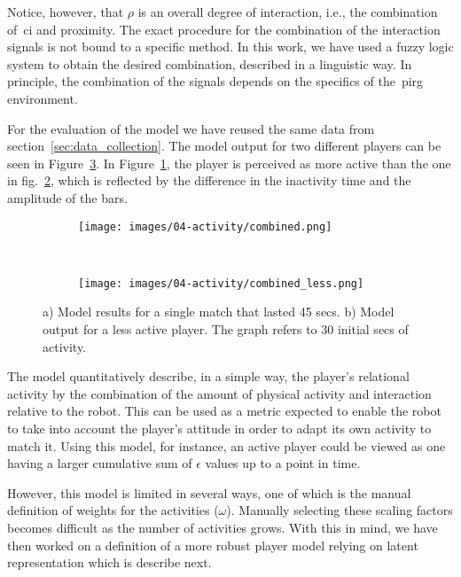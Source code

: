 Notice, however, that $\rho$ is an overall degree of interaction, i.e., the combination of~\gls{ci} and proximity. The exact procedure for the combination of the interaction signals is not bound to a specific method. In this work, we have used a fuzzy logic system to obtain the desired combination, described in a linguistic way. In principle, the combination of the signals depends on the specifics of the~\gls{pirg} environment.

For the evaluation of the model we have reused the same data from section~\ref{sec:data_collection}. The model output for two different players can be seen in Figure~\ref{fig:model_output}. In Figure~\ref{fig:fun}, the player is perceived as more active than the one in fig.~\ref{fig:nofun}, which is reflected by the difference in the inactivity time and the amplitude of the bars.

\begin{figure}[h]
    \centering 
	\begin{subfigure}[h]{5cm}
		\centering      
		\texttt{[image: images/04-activity/combined.png]}
		\caption{}
		\label{fig:fun}
	\end{subfigure}
	~
	\begin{subfigure}[h]{5cm}
		\centering      
      	\texttt{[image: images/04-activity/combined\_less.png]}
      	\caption{}
      	\label{fig:nofun}
     \end{subfigure}
      \caption{a) Model results for a single match that lasted 45 secs. b) Model output for a less active player. The graph refers to 30 initial secs of activity.}		
      \label{fig:model_output}
\end{figure}

The model quantitatively describe, in a simple way, the player's relational activity by the combination of the amount of physical activity and interaction relative to the robot. This can be used as a metric expected to enable the robot to take into account the player's attitude in order to adapt its own activity to match it. Using this model, for instance, an active player could be viewed as one having a larger cumulative sum of $\epsilon$ values up to a point in time.

However, this model is limited in several ways, %
one of which is the manual definition of weights for the activities ($\omega$). Manually selecting these scaling factors becomes difficult as the number of activities grows. With this in mind, we have then worked on a definition of a more robust player model relying on latent representation which  is describe next.

